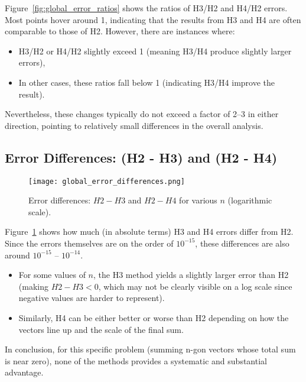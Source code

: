 \documentclass[a4paper,12pt]{article}
\begin{document}
Figure~\ref{fig:global_error_ratios} shows the ratios of H3/H2 and H4/H2 errors. Most points hover around 1, indicating that the results from H3 and H4 are often comparable to those of H2. However, there are instances where:
\begin{itemize}
    \item H3/H2 or H4/H2 slightly exceed 1 (meaning H3/H4 produce slightly larger errors),
    \item In other cases, these ratios fall below 1 (indicating H3/H4 improve the result).
\end{itemize}
Nevertheless, these changes typically do not exceed a factor of 2--3 in either direction, pointing to relatively small differences in the overall analysis.

\subsection{Error Differences: (H2 - H3) and (H2 - H4)}
\begin{figure}[H]
    \centering
    \texttt{[image: global\_error\_differences.png]}
    \caption{Error differences: \( H2 - H3 \) and \( H2 - H4 \) for various \(n\) (logarithmic scale).}
    \label{fig:global_error_differences}
\end{figure}

Figure~\ref{fig:global_error_differences} shows how much (in absolute terms) H3 and H4 errors differ from H2. Since the errors themselves are on the order of \(10^{-15}\), these differences are also around \(10^{-15}\) -- \(10^{-14}\).  
\begin{itemize}
    \item For some values of \(n\), the H3 method yields a slightly larger error than H2 (making \(H2 - H3 < 0\), which may not be clearly visible on a log scale since negative values are harder to represent).
    \item Similarly, H4 can be either better or worse than H2 depending on how the vectors line up and the scale of the final sum.
\end{itemize}
In conclusion, for this specific problem (summing n-gon vectors whose total sum is near zero), none of the methods provides a systematic and substantial advantage.
\end{document}
